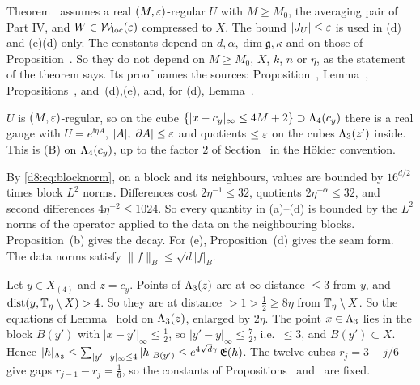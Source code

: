 \begin{detail}\label{d8:ix4}
\begin{step}[Hypotheses]
Theorem~ assumes a real $(M,\varepsilon)$-regular $U$ with $M\ge M_0$, the averaging pair of Part IV, and $W\in\mathcal W_{\rm loc}(\varepsilon)$ compressed to $X$. The bound $|J_U|\le\varepsilon$ is used in (d) and (e)(d) only. The constants depend on $d,\alpha,\dim\mathfrak g,\kappa$ and on those of Proposition~. So they do not depend on $M\ge M_0$, $X$, $k$, $n$ or $\eta$, as the statement of the theorem says. Its proof names the sources: Proposition~, Lemma~, Propositions~,  and~(d),(e), and, for (d), Lemma~.
\end{step}
\begin{step}
$U$ is $(M,\varepsilon)$-regular, so on the cube $\{|x-c_y|_\infty\le4M+2\}\supset\Lambda_4(c_y)$ there is a real gauge with $U=e^{\ii\eta A}$, $|A|,|\partial A|\le\varepsilon$ and quotients $\le\varepsilon$ on the cubes $\Lambda_3(z')$ inside. This is (B) on $\Lambda_4(c_y)$, up to the factor $2$ of Section~ in the H\"older convention.
\end{step}
\begin{step}
By \eqref{d8:eq:blocknorm}, on a block and its neighbours, values are bounded by $16^{d/2}$ times block $L^2$ norms. Differences cost $2\eta^{-1}\le32$, quotients $2\eta^{-\alpha}\le32$, and second differences $4\eta^{-2}\le1024$. So every quantity in (a)--(d) is bounded by the $L^2$ norms of the operator applied to the data on the neighbouring blocks. Proposition~(b) gives the decay. For (e), Proposition~(d) gives the seam form. The data norms satisfy $\|f\|_{B}\le\sqrt d|f|_B$.
\end{step}
\begin{step}
Let $y\in X_{(4)}$ and $z=c_y$. Points of $\Lambda_3(z)$ are at $\infty$-distance $\le3$ from $y$, and $\operatorname{dist}(y,\mathbb T_\eta\setminus X)>4$. So they are at distance $>1>\frac12\ge8\eta$ from $\mathbb T_\eta\setminus X$. So the equations of Lemma~ hold on $\Lambda_3(z)$, enlarged by $2\eta$. The point $x\in\Lambda_3$ lies in the block $B(y')$ with $|x-y'|_\infty\le\frac12$, so $|y'-y|_\infty\le\frac72$, i.e.\ $\le3$, and $B(y')\subset X$. Hence $|h|_{\Lambda_3}\le\sum_{|y'-y|_\infty\le4}|h|_{B(y')}\le e^{4\sqrt d\gamma}\,\mathfrak E(h)$. The twelve cubes $r_j=3-j/6$ give gaps $r_{j-1}-r_j=\frac16$, so the constants of Propositions~ and~ are fixed.
\end{step}
\end{detail}

